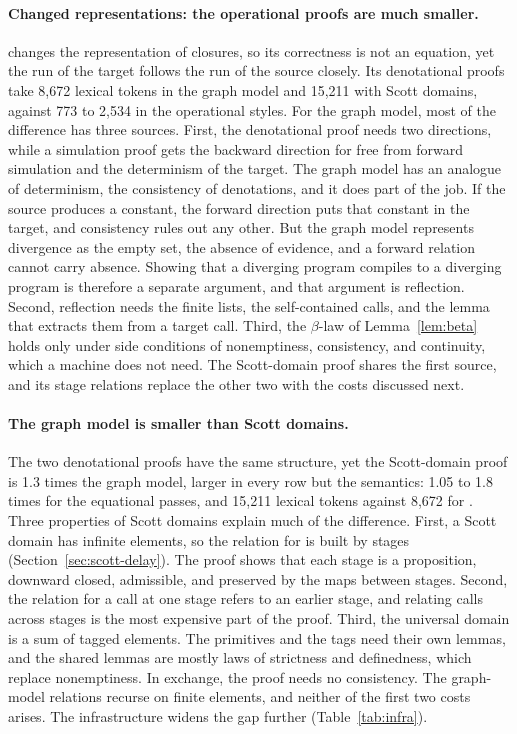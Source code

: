 \paragraph{Changed representations: the operational proofs are much smaller.}

 changes the representation of closures, so its
correctness is not an equation, yet the run of the target follows the
run of the source closely. Its denotational proofs take 8,672 lexical
tokens in the graph model and 15,211 with Scott domains, against 773
to 2,534 in the operational styles. For the graph model, most of the
difference has three sources. First, the denotational proof needs two
directions, while a simulation proof gets the backward direction for
free from forward simulation and the determinism of the target.  The
graph model has an analogue of determinism, the consistency of
denotations, and it does part of the job. If the source produces a
constant, the forward direction puts that constant in the target, and
consistency rules out any other. But the graph model represents
divergence as the empty set, the absence of evidence, and a forward
relation cannot carry absence. Showing that a diverging program
compiles to a diverging program is therefore a separate argument, and
that argument is reflection. Second, reflection needs the finite
lists, the self-contained calls, and the lemma that extracts them from
a target call. Third, the $\beta$-law of Lemma~\ref{lem:beta} holds
only under side conditions of nonemptiness, consistency, and
continuity, which a machine does not need. The Scott-domain proof
shares the first source, and its stage relations replace the other two
with the costs discussed next.

\paragraph{The graph model is smaller than Scott domains.}

The two denotational proofs have the same structure, yet the
Scott-domain proof is 1.3 times the graph model, larger in every row
but the semantics: 1.05 to 1.8 times for the equational passes, and 15,211
lexical tokens against 8,672 for . Three properties of Scott
domains explain much of the difference. First, a Scott domain has
infinite elements, so the relation for  is built by
stages (Section~\ref{sec:scott-delay}). The proof shows that each stage
is a proposition, downward closed, admissible, and preserved by the maps
between stages. Second, the relation for a call at one stage refers to
an earlier stage, and relating calls across stages is the most
expensive part of the proof. Third, the universal domain is a sum of
tagged elements. The primitives and the tags need their own lemmas, and
the shared lemmas are mostly laws of strictness and definedness, which replace
nonemptiness. In exchange, the proof needs no consistency. The
graph-model relations recurse on finite elements, and neither of the
first two costs arises. The infrastructure widens the gap further
(Table~\ref{tab:infra}).


